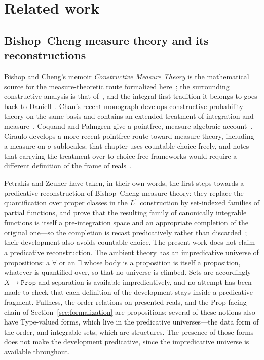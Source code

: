 \documentclass[11pt]{article}
\theoremstyle{definition}
\theoremstyle{remark}
\begin{document}
\section{Related work}
\label{sec:related}

\subsection*{Bishop--Cheng measure theory and its reconstructions}
Bishop and Cheng's memoir \emph{Constructive Measure Theory} is the mathematical source for the measure-theoretic route formalized here~\cite{bishop-cheng-1972}; the surrounding constructive analysis is that of~\cite{bishop-1967,bishop-bridges-1985}, and the integral-first tradition it belongs to goes back to Daniell~\cite{daniell-1918}.  Chan's recent monograph develops constructive probability theory on the same basis and contains an extended treatment of integration and measure~\cite{chan-2021}.  Coquand and Palmgren give a pointfree, measure-algebraic account~\cite{coquand-palmgren-2002}.
Ciraulo develops a more recent pointfree route toward measure theory, including a measure on $\sigma$-sublocales; that chapter uses countable choice freely, and notes that carrying the treatment over to choice-free frameworks would require a different definition of the frame of reals~\cite{ciraulo-2023}.

Petrakis and Zeuner have taken, in their own words, the first steps towards a predicative reconstruction of Bishop--Cheng measure theory: they replace the quantification over proper classes in the $L^1$ construction by set-indexed families of partial functions, and prove that the resulting family of canonically integrable functions is itself a pre-integration space and an appropriate completion of the original one---so the completion is recast predicatively rather than discarded~\cite{petrakis-zeuner-2024}; their development also avoids countable choice.  The present work does not claim a predicative reconstruction.  The ambient theory has an impredicative universe of propositions: a $\forall$ or an $\exists$ whose body is a proposition is itself a proposition, whatever is quantified over, so that no universe is climbed.  Sets are accordingly $X\to\texttt{Prop}$ and separation is available impredicatively, and no attempt has been made to check that each definition of the development stays inside a predicative fragment.  Fullness, the order relations on presented reals, and the Prop-facing chain of Section~\ref{sec:formalization} are propositions; several of these notions also have Type-valued forms, which live in the predicative universes---the data form of the order, and integrable sets, which are structures.  The presence of those forms does not make the development predicative, since the impredicative universe is available throughout.
\end{document}
